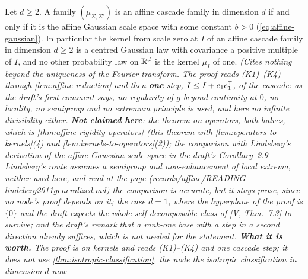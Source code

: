 \begin{theorem}
\label{thm:affine-rigidity}
\leanok
Let $d \ge 2$. A family $(\mu_{\Sigma,\Sigma'})$ is an affine cascade family in dimension $d$ if
and only if it is the affine Gaussian scale space with some constant $b > 0$
(\ref{eq:affine-gaussian}). In particular the kernel from scale zero at $I$ of an affine cascade
family in dimension $d \ge 2$ is a centred Gaussian law with covariance a positive multiple of $I$,
and no other probability law on $\mathbb{R}^d$ is the kernel $\mu_I$ of one.
\statusT\quad\emph{(Cites nothing beyond the uniqueness of the Fourier transform. The proof reads
(K1)--(K4) through \ref{lem:affine-reduction} and then \textbf{one} step,
$I \le I + e_1e_1^{\mathsf{T}}$, of the cascade: as the draft's first comment says, no regularity of $g$
beyond continuity at $0$, no locality, no semigroup and no extremum principle is used, and here no
infinite divisibility either. \textbf{Not claimed here}: the theorem on operators, both halves,
which is \ref{thm:affine-rigidity-operators} (this theorem with \ref{lem:operators-to-kernels}(4)
and \ref{lem:kernels-to-operators}(2)); the
comparison with Lindeberg's derivation of the affine Gaussian scale space in the draft's
Corollary~2.9 --- Lindeberg's route assumes a semigroup and non-enhancement of local extrema,
neither used here, and read at the page (records/affine/READING-lindeberg2011generalized.md) the
comparison is accurate, but it stays prose, since no node's proof depends on it; the case $d = 1$, where the
hyperplane of the proof is $\{0\}$ and the draft expects the whole self-decomposable class of
[V, Thm.~7.3] to survive; and the draft's remark that a rank-one base with a step in a second
direction already suffices, which is not needed for the statement. \textbf{What it is worth.} The
proof is on kernels and reads (K1)--(K4) and one cascade step; it does not use
\ref{thm:isotropic-classification}, the node the isotropic classification in dimension $d$ now
}
\end{theorem}
